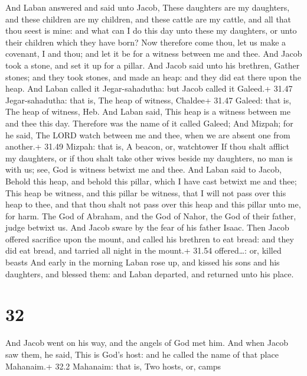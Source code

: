  And Laban answered and said unto Jacob, These daughters
are my daughters, and these children are my children, and these cattle
are my cattle, and all that thou seest is mine: and what can I do this
day unto these my daughters, or unto their children which they have
born?  Now therefore come thou, let us make a covenant, I
and thou; and let it be for a witness between me and thee. 
And Jacob took a stone, and set it up for a pillar.  And
Jacob said unto his brethren, Gather stones; and they took stones, and
made an heap: and they did eat there upon the heap.  And
Laban called it Jegar-sahadutha: but Jacob called it Galeed.+ 31.47
Jegar-sahadutha: that is, The heap of witness, Chaldee+ 31.47 Galeed:
that is, The heap of witness, Heb.  And Laban said, This
heap is a witness between me and thee this day. Therefore was the name
of it called Galeed;  And Mizpah; for he said, The LORD
watch between me and thee, when we are absent one from another.+ 31.49
Mizpah: that is, A beacon, or, watchtower  If thou shalt
afflict my daughters, or if thou shalt take other wives beside my
daughters, no man is with us; see, God is witness betwixt me and thee.
 And Laban said to Jacob, Behold this heap, and behold this
pillar, which I have cast betwixt me and thee;  This heap
be witness, and this pillar be witness, that I will not pass over this
heap to thee, and that thou shalt not pass over this heap and this
pillar unto me, for harm.  The God of Abraham, and the God
of Nahor, the God of their father, judge betwixt us. And Jacob sware by
the fear of his father Isaac.  Then Jacob offered sacrifice
upon the mount, and called his brethren to eat bread: and they did eat
bread, and tarried all night in the mount.+ 31.54 offered\ldots: or,
killed beasts  And early in the morning Laban rose up, and
kissed his sons and his daughters, and blessed them: and Laban departed,
and returned unto his place.

\hypertarget{section-31}{%
\section{32}\label{section-31}}

 And Jacob went on his way, and the angels of God met him.
 And when Jacob saw them, he said, This is God's host: and
he called the name of that place Mahanaim.+ 32.2 Mahanaim: that is, Two
hosts, or, camps

